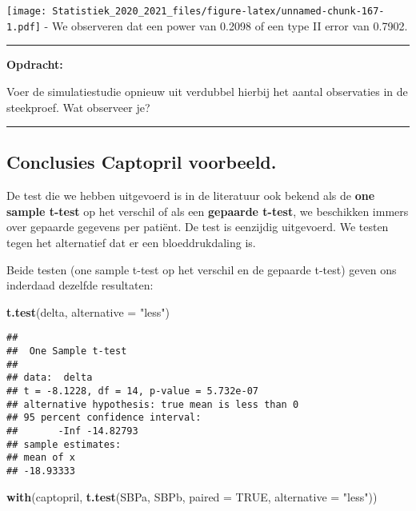 \documentclass[
  12pt,dutch,coursenotes]{book}
\newenvironment{Shaded}{\begin{snugshade}}{\end{snugshade}}
\newcommand{\DataTypeTok}[1]{\textcolor[rgb]{0.13,0.29,0.53}{#1}}
\newcommand{\KeywordTok}[1]{\textcolor[rgb]{0.13,0.29,0.53}{\textbf{#1}}}
\newcommand{\NormalTok}[1]{#1}
\newcommand{\OtherTok}[1]{\textcolor[rgb]{0.56,0.35,0.01}{#1}}
\newcommand{\StringTok}[1]{\textcolor[rgb]{0.31,0.60,0.02}{#1}}
\theoremstyle{definition}
\theoremstyle{definition}
\theoremstyle{definition}
\theoremstyle{remark}
\begin{document}
\texttt{[image: Statistiek\_2020\_2021\_files/figure-latex/unnamed-chunk-167-1.pdf]}
- We observeren dat een power van 0.2098 of een type II error van 0.7902.

\begin{center}\rule{0.5\linewidth}{0.5pt}\end{center}

\textbf{Opdracht:}

Voer de simulatiestudie opnieuw uit verdubbel hierbij het aantal observaties in de steekproef. Wat observeer je?

\begin{center}\rule{0.5\linewidth}{0.5pt}\end{center}

\hypertarget{conclusies-captopril-voorbeeld.}{%
\subsection{Conclusies Captopril voorbeeld.}\label{conclusies-captopril-voorbeeld.}}

De test die we hebben uitgevoerd is in de literatuur ook bekend als de \textbf{one sample t-test} op het verschil of als een \textbf{gepaarde t-test}, we beschikken immers over gepaarde gegevens per patiënt.
De test is eenzijdig uitgevoerd. We testen tegen het alternatief dat er een bloeddrukdaling is.

Beide testen (one sample t-test op het verschil en de gepaarde t-test) geven ons inderdaad dezelfde resultaten:

\begin{Shaded}
\begin{Highlighting}[]
\KeywordTok{t.test}\NormalTok{(delta, }\DataTypeTok{alternative =} \StringTok{"less"}\NormalTok{)}
\end{Highlighting}
\end{Shaded}

\begin{verbatim}
## 
##  One Sample t-test
## 
## data:  delta
## t = -8.1228, df = 14, p-value = 5.732e-07
## alternative hypothesis: true mean is less than 0
## 95 percent confidence interval:
##       -Inf -14.82793
## sample estimates:
## mean of x 
## -18.93333
\end{verbatim}

\begin{Shaded}
\begin{Highlighting}[]
\KeywordTok{with}\NormalTok{(captopril, }\KeywordTok{t.test}\NormalTok{(SBPa, SBPb, }\DataTypeTok{paired =} \OtherTok{TRUE}\NormalTok{, }\DataTypeTok{alternative =} \StringTok{"less"}\NormalTok{))}
\end{Highlighting}
\end{Shaded}
\end{document}
